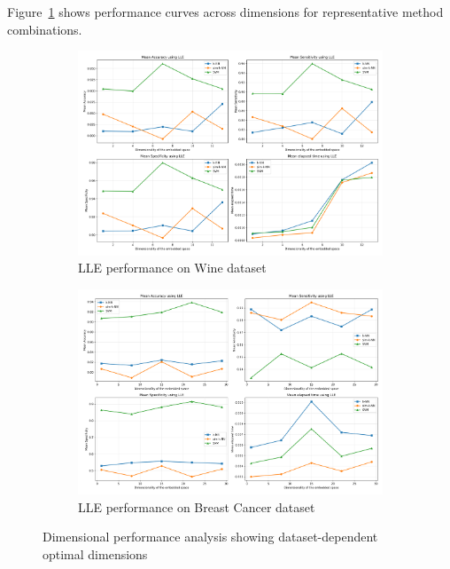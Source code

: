 \documentclass[review]{elsarticle}
\begin{document}
Figure~\ref{fig:dimensional_analysis} shows performance curves across dimensions for representative method combinations.

\begin{figure}[H]
\centering
\begin{subfigure}[b]{0.48\textwidth}
\includegraphics[width=\textwidth]{../python/results/plots/Mean_Results_LLE_Data_Wine.pdf}
\caption{LLE performance on Wine dataset}
\end{subfigure}
\hfill
\begin{subfigure}[b]{0.48\textwidth}
\includegraphics[width=\textwidth]{../python/results/plots/Mean_Results_LLE_Data_BreastCancer.pdf}
\caption{LLE performance on Breast Cancer dataset}
\end{subfigure}
\caption{Dimensional performance analysis showing dataset-dependent optimal dimensions}
\label{fig:dimensional_analysis}
\end{figure}
\end{document}
